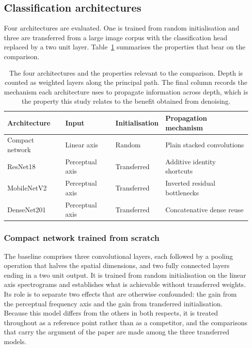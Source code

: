 \subsection{Classification architectures}\label{sec:d-arch}

Four architectures are evaluated. One is trained from random initialisation
and three are transferred from a large image corpus with the classification
head replaced by a two unit layer. Table~\ref{tab:arch} summarises the
properties that bear on the comparison.

\begin{table}[t]
\centering
\footnotesize
\caption{The four architectures and the properties relevant to the
comparison. Depth is counted as weighted layers along the principal path. The
final column records the mechanism each architecture uses to propagate
information across depth, which is the property this study relates to the
benefit obtained from denoising.}
\label{tab:arch}
\begin{tabular}{@{}llll@{}}
\toprule
Architecture & Input & Initialisation & Propagation mechanism \\
\midrule
Compact network & Linear axis & Random & Plain stacked convolutions \\
ResNet18 & Perceptual axis & Transferred & Additive identity shortcuts \\
MobileNetV2 & Perceptual axis & Transferred & Inverted residual bottlenecks \\
DenseNet201 & Perceptual axis & Transferred & Concatenative dense reuse \\
\bottomrule
\end{tabular}
\end{table}

\subsubsection{Compact network trained from scratch}\label{sec:d-cnn}

The baseline comprises three convolutional layers, each followed by a pooling
operation that halves the spatial dimensions, and two fully connected layers
ending in a two unit output. It is trained from random initialisation on the
linear axis spectrograms and establishes what is achievable without
transferred weights. Its role is to separate two effects that are otherwise
confounded: the gain from the perceptual frequency axis and the gain from
transferred initialisation. Because this model differs from the others in both
respects, it is treated throughout as a reference point rather than as a
competitor, and the comparisons that carry the argument of the paper are made
among the three transferred models.

